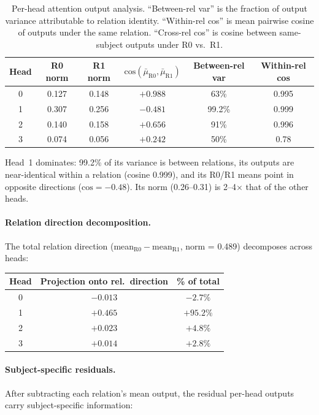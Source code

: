 \documentclass[11pt,a4paper]{article}
\newcommand{\cosim}{\mathrm{cos}}
\begin{document}
\begin{table}[h]
\centering
\caption{Per-head attention output analysis. ``Between-rel var'' is the
  fraction of output variance attributable to relation identity.
  ``Within-rel cos'' is mean pairwise cosine of outputs under the same
  relation. ``Cross-rel cos'' is cosine between same-subject outputs
  under R0 vs.\ R1.}
\label{tab:per_head}
\begin{tabular}{cccccc}
\toprule
Head & R0 norm & R1 norm & $\cosim(\bar{\mu}_{\text{R0}}, \bar{\mu}_{\text{R1}})$
  & Between-rel var & Within-rel cos \\
\midrule
0 & 0.127 & 0.148 & $+0.988$ & 63\% & 0.995 \\
1 & 0.307 & 0.256 & $-0.481$ & 99.2\% & 0.999 \\
2 & 0.140 & 0.158 & $+0.656$ & 91\% & 0.996 \\
3 & 0.074 & 0.056 & $+0.242$ & 50\% & 0.78 \\
\bottomrule
\end{tabular}
\end{table}

Head~1 dominates: 99.2\% of its variance is between relations, its
outputs are near-identical within a relation (cosine 0.999), and its
R0/R1 means point in opposite directions ($\cosim = -0.48$). Its norm
(0.26--0.31) is 2--4$\times$ that of the other heads.

\paragraph{Relation direction decomposition.}
The total relation direction (mean$_{\text{R0}} -
\text{mean}_{\text{R1}}$, norm = 0.489) decomposes across heads:

\begin{center}
\begin{tabular}{ccc}
\toprule
Head & Projection onto rel.\ direction & \% of total \\
\midrule
0 & $-0.013$ & $-2.7\%$ \\
1 & $+0.465$ & $+95.2\%$ \\
2 & $+0.023$ & $+4.8\%$ \\
3 & $+0.014$ & $+2.8\%$ \\
\bottomrule
\end{tabular}
\end{center}

\paragraph{Subject-specific residuals.}
After subtracting each relation's mean output, the residual
per-head outputs carry subject-specific information:
\end{document}
